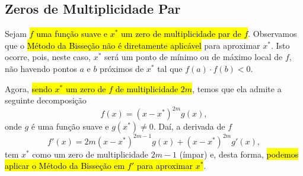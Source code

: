 \subsection{Zeros de Multiplicidade Par}

Sejam \hl{$f$ uma função suave e $x^*$ um zero de multiplicidade par de $f$}. Observamos que o \hl{Método da Bisseção não é diretamente aplicável} para aproximar $x^*$. Isto ocorre, pois, neste caso, $x^*$ será um ponto de mínimo ou de máximo local de $f$, não havendo pontos $a$ e $b$ próximos de $x^*$ tal que $f(a)\cdot f(b) < 0$.

Agora, \hl{sendo $x^*$ um zero de $f$ de multiplicidade $2m$}, temos que ela admite a seguinte decomposição
\begin{equation}
  f(x) = (x-x^*)^{2m}g(x),
\end{equation}
onde $g$ é uma função suave e $g(x^*)\neq 0$. Daí, a derivada de $f$
\begin{equation}
  f'(x) = 2m(x-x^*)^{2m-1}g(x) + (x-x^*)^{2m}g'(x),
\end{equation}
tem $x^*$ como um zero de multiplicidade $2m-1$ (ímpar) e, desta forma, \hl{podemos aplicar o Método da Bisseção em $f'$ para aproximar $x^*$}.

